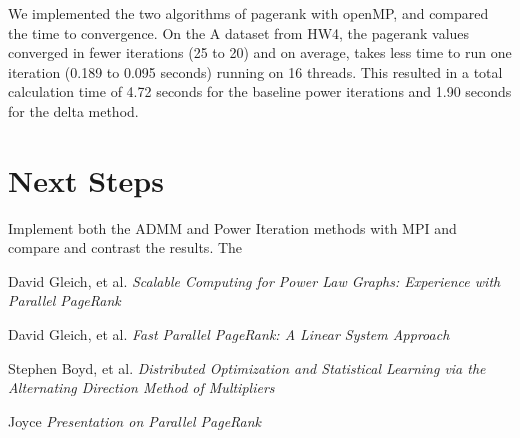 \documentclass[a4paper,10pt]{article}
\begin{document}
We implemented the two algorithms of pagerank with openMP, and compared the time to convergence. On the A dataset from HW4, the pagerank values converged in fewer iterations (25 to 20) and on average, takes less time to run one iteration (0.189 to 0.095 seconds) running on 16 threads. This resulted in a total calculation time of 4.72 seconds for the baseline power iterations and 1.90 seconds for the delta method. 

\section{Next Steps}

Implement both the ADMM and Power Iteration methods with MPI and compare and contrast the results. The 



\begin{thebibliography}{1}

 David Gleich, et al. {\em Scalable Computing for Power Law Graphs: Experience with Parallel PageRank}

 David Gleich, et al. {\em Fast Parallel PageRank: A Linear System Approach} 

 Stephen Boyd, et al. {\em Distributed Optimization and Statistical Learning via the Alternating Direction Method of Multipliers} 

 Joyce {\em Presentation on Parallel PageRank}
  
\end{thebibliography}
\end{document}

